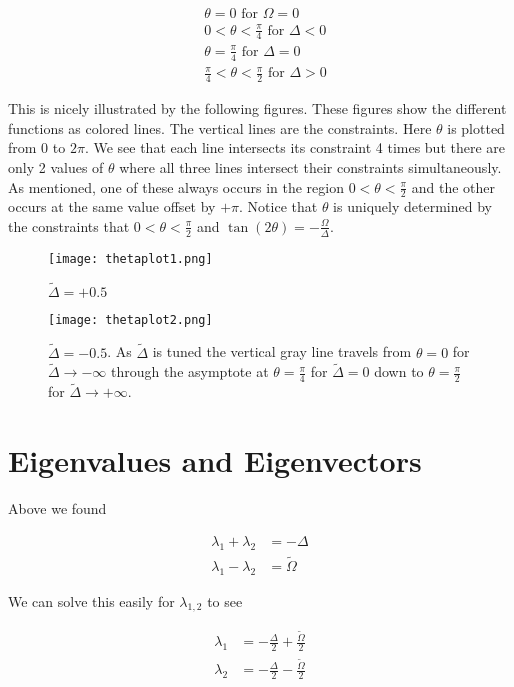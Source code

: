 \documentclass[12pt]{article}
\begin{document}
\begin{align}
&\theta = 0 \text{ for } \Omega = 0\\
&0<\theta<\frac{\pi}{4} \text{ for } \Delta<0\\
&\theta = \frac{\pi}{4} \text{ for } \Delta =0\\
&\frac{\pi}{4}<\theta<\frac{\pi}{2} \text{ for } \Delta>0
\end{align}

This is nicely illustrated by the following figures. These figures show the different functions as colored lines. The vertical lines are the constraints. Here $\theta$ is plotted from $0$ to $2\pi$. We see that each line intersects its constraint 4 times but there are only 2 values of $\theta$ where all three lines intersect their constraints simultaneously. As mentioned, one of these always occurs in the region $0<\theta<\frac{\pi}{2}$ and the other occurs at the same value offset by $+\pi$. Notice that $\theta$ is uniquely determined by the constraints that $0<\theta<\frac{\pi}{2}$ and $\tan(2\theta) = -\frac{\Omega}{\Delta}$.

\newpage
\begin{figure}[h]
\centering
\texttt{[image: thetaplot1.png]}
\caption{$\tilde{\Delta}=+0.5$}
\end{figure}

\begin{figure}[h]
\centering
\texttt{[image: thetaplot2.png]}
\caption{$\tilde{\Delta}=-0.5$. As $\tilde{\Delta}$ is tuned the vertical gray line travels from $\theta = 0$ for $\tilde{\Delta}\rightarrow-\infty$ through the asymptote at $\theta = \frac{\pi}{4}$ for $\tilde{\Delta}=0$ down to $\theta=\frac{\pi}{2}$ for $\tilde{\Delta}\rightarrow +\infty$.}
\end{figure}


\newpage
\section{Eigenvalues and Eigenvectors}

Above we found

\begin{align}
\lambda_1 + \lambda_2 &= -\Delta\\
\lambda_1 - \lambda_2 &= \tilde{\Omega}
\end{align}

We can solve this easily for $\lambda_{1,2}$ to see

\begin{align}
\lambda_1 &= -\frac{\Delta}{2} + \frac{\tilde{\Omega}}{2}\\
\lambda_2 &= -\frac{\Delta}{2} - \frac{\tilde{\Omega}}{2}
\end{align}
\end{document}
